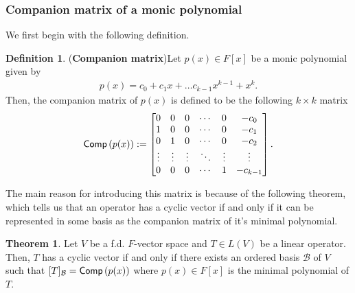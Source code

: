 \documentclass[letterpaper,11pt,twoside]{article}
\theoremstyle{definition}
\theoremstyle{definition}
\newtheorem{definition}[proposition]{Definition}
\newtheorem{theorem}[proposition]{Theorem}
\theoremstyle{definition}
\theoremstyle{definition}
\theoremstyle{definition}
\theoremstyle{definition}
\theoremstyle{remark}
\theoremstyle{definition}
\newcommand{\Comp}[1]{{\fontfamily{lmss}\selectfont 
            \text{Comp}\left(#1\right)
}}
\begin{document}
    \subsubsection{Companion matrix of a monic polynomial}
    We first begin with the following definition.
    \begin{definition}(\textbf{Companion matrix})\label{D-3.1.3}
    Let $p(x)\in F[x]$ be a monic polynomial given by
    \begin{align*}
        p(x) = c_0 + c_1x + \dots c_{k-1}x^{k-1} + x^k.
    \end{align*}
    Then, the companion matrix of $p(x)$ is defined to be the following $k\times k$ matrix
    \begin{align*}
        \Comp{p(x)} := \begin{bmatrix}
            0 & 0 & 0 & \cdots & 0 & -c_0\\
            1 & 0 & 0 & \cdots & 0 & -c_1\\
            0 & 1 & 0 & \cdots & 0 & -c_2\\
            \vdots & \vdots & \vdots & \ddots & \vdots & \vdots\\
            0 & 0 & 0 & \cdots & 1 & -c_{k-1}
        \end{bmatrix}.
    \end{align*}
    \end{definition}
    The main reason for introducing this matrix is because of the following theorem, which tells us that an operator has a cyclic vector if and only if it can be represented in some basis as the companion matrix of it's minimal polynomial.
    \begin{theorem}\label{T-3.1.4}
    Let $V$ be a f.d. $F$-vector space and $T \in L(V)$ be a linear operator. Then, $T$ has a cyclic vector if and only if there exists an ordered basis $\mathcal{B}$ of $V$ such that $[T]_{\mathcal{B}} = \Comp{p(x)}$ where $p(x) \in F[x]$ is the minimal polynomial of $T$.
    \end{theorem}
\end{document}
